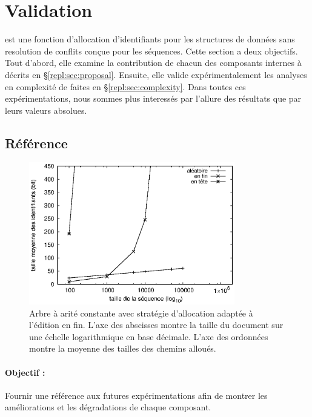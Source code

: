 
\section{Validation}
\label{repl:sec:validation}

\LSEQ est une fonction d'allocation d'identifiants pour les structures de
données sans resolution de conflits conçue pour les séquences.  Cette section a
deux objectifs. Tout d'abord, elle examine la contribution de chacun des
composants internes à \LSEQ décrits en §\ref{repl:sec:proposal}.  Ensuite, elle
valide expérimentalement les analyses en complexité de \LSEQ faites en
§\ref{repl:sec:complexity}. Dans toutes ces expérimentations, nous sommes plus
interessés par l'allure des résultats que par leurs valeurs absolues.

\subsection{Référence}

\begin{figure}
  \begin{center}
    \includegraphics[width=0.8\textwidth]{img/lseq/logoot.eps}
    \caption{\label{repl:img:logoot} Arbre à arité constante avec stratégie
      d'allocation adaptée à l'édition en fin. L'axe des abscisses montre la
      taille du document sur une échelle logarithmique en base décimale. L'axe
      des ordonnées montre la moyenne des tailles des chemins alloués.}
  \end{center}
\end{figure}


\paragraph{Objectif :} Fournir une référence aux futures expérimentations afin
de montrer les améliorations et les dégradations de chaque composant.

